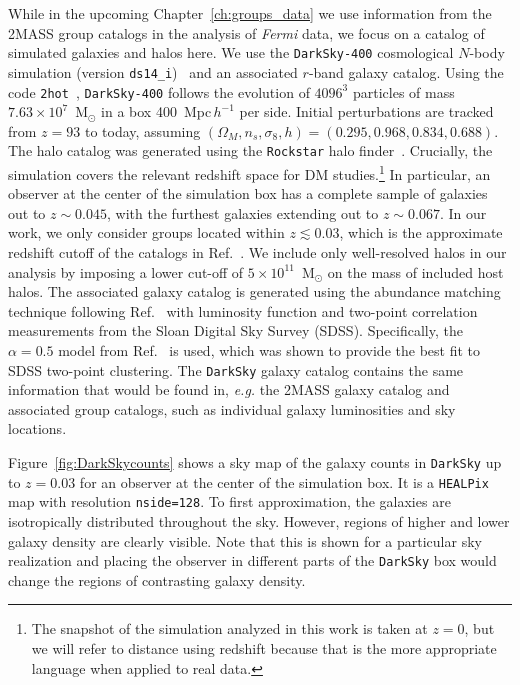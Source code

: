 While in the upcoming Chapter~\ref{ch:groups_data} we use information from the 2MASS group catalogs in the analysis of \emph{Fermi} data, we focus on a catalog of simulated galaxies and halos here.  We use the \texttt{DarkSky-400} cosmological $N$-body simulation (version \texttt{ds14\_i})~\cite{Skillman:2014qca,Lehmann:2015ioa} and an associated $r$-band galaxy catalog.  Using the code \texttt{2hot}~\cite{Warren:2013vma}, \texttt{DarkSky-400}  follows the evolution of $4096^3$ particles of mass $7.63 \times 10^7$~M$_\odot$ in a box 400~Mpc$\,h^{-1}$ per side.  Initial perturbations are tracked from $z=93$ to today, assuming $(\Omega_M, n_s, \sigma_8, h) = (0.295, 0.968, 0.834, 0.688)$.   The halo catalog was generated using the \texttt{Rockstar} halo finder~\cite{Behroozi:2011ju, Lehmann:2015ioa}.  Crucially, the simulation covers the relevant redshift space for DM studies.\footnote{The snapshot of the simulation analyzed in this work is taken at $z = 0$, but we will refer to distance using redshift because that is the more appropriate language when applied to real data.}  In particular, an observer at the center of the simulation box has a complete sample of galaxies out to \mbox{$z \sim 0.045$}, with the furthest galaxies extending out to \mbox{$z \sim 0.067$}.  In our work, we only consider groups located within $z\lesssim 0.03$, which is the approximate redshift cutoff of the catalogs in Ref.~\cite{Tully:2015opa,2017ApJ...843...16K,Lu:2016vmu}. We include only well-resolved halos in our analysis by imposing a lower cut-off of $5\times10^{11}$~M$_\odot$ on the mass of included host halos. The associated galaxy catalog is generated using the abundance matching technique following Ref.~\cite{Behroozi:2010rx,Reddick:2012qy} with luminosity function and two-point correlation measurements from the Sloan Digital Sky Survey (SDSS).  Specifically, the $\alpha=0.5$ model from Ref.~\cite{Lehmann:2015ioa} is used, which was shown to provide the best fit to SDSS two-point clustering.  The \texttt{DarkSky} galaxy catalog contains the same information that would be found in, \emph{e.g.} the 2MASS galaxy catalog and associated group catalogs, such as individual galaxy luminosities and sky locations. 

Figure~\ref{fig:DarkSkycounts} shows a sky map of the galaxy counts in \texttt{DarkSky} up to $z=0.03$ for an observer at the center of the simulation box.  It is a \texttt{HEALPix}~\cite{Gorski:2004by} map with resolution \texttt{nside=128}. To first approximation, the galaxies are isotropically distributed throughout the sky.  However, regions of higher and lower galaxy density are clearly visible. Note that this is shown for a particular sky realization and placing the observer in different parts of the \texttt{DarkSky} box would change the regions of contrasting galaxy density.

